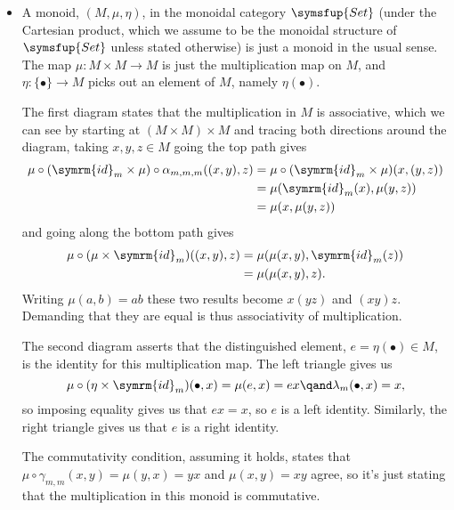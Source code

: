 \documentclass[fleqn]{NotesClass}
\makeatletter
\newcommand{\c@egory}[1]{\symsfup{#1}}
\newcommand{\Set}{\c@egory{Set}}
\newcommand{\id}{\symrm{id}}
\makeatother
\begin{document}
    \begin{exm}{}{}
        \begin{itemize}
            \item A monoid, \((M, \mu, \eta)\), in the monoidal category \(\Set\) (under the Cartesian product, which we assume to be the monoidal structure of \(\Set\) unless stated otherwise) is just a monoid in the usual sense.
            The map \(\mu \colon M \times M \to M\) is just the multiplication map on \(M\), and \(\eta \colon \{\bullet\} \to M\) picks out an element of \(M\), namely \(\eta(\bullet)\).
            
            The first diagram states that the multiplication in \(M\) is associative, which we can see by starting at \((M \times M) \times M\) and tracing both directions around the diagram, taking \(x, y, z \in M\) going the top path gives 
            \begin{align}
                \mu \circ (\id_m \times \mu) \circ \alpha_{m,m,m}((x, y), z) &= \mu \circ (\id_m \times \mu)(x, (y, z))\\
                &= \mu(\id_m (x), \mu(y, z))\\
                &= \mu(x, \mu(y, z))
            \end{align}
            and going along the bottom path gives
            \begin{align}
                \mu \circ (\mu \times \id_m)((x, y), z) &= \mu(\mu(x, y), \id_m(z))\\
                &= \mu(\mu(x, y), z).
            \end{align}
            Writing \(\mu(a, b) = a b\) these two results become \(x(yz)\) and \((xy)z\).
            Demanding that they are equal is thus associativity of multiplication.
            
            The second diagram asserts that the distinguished element, \(e = \eta(\bullet) \in M\), is the identity for this multiplication map.
            The left triangle gives us
            \begin{equation}
                \mu \circ (\eta \times \id_m)(\bullet, x) = \mu(e, x) = ex \qand \lambda_m(\bullet, x) = x,
            \end{equation}
            so imposing equality gives us that \(ex = x\), so \(e\) is a left identity.
            Similarly, the right triangle gives us that \(e\) is a right identity.
            
            The commutativity condition, assuming it holds, states that \(\mu \circ \gamma_{m,m}(x, y) = \mu(y, x) = yx\) and \(\mu(x, y) = xy\) agree, so it's just stating that the multiplication in this monoid is commutative.
            

\end{itemize}
\end{exm}
\end{document}
